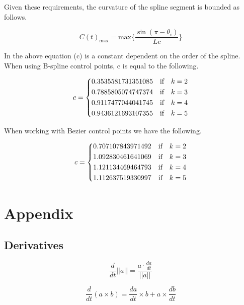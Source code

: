\documentclass{article}
\begin{document}
Given these requirements, the curvature of the spline segment is bounded as follows.

\begin{equation}
    C(t)_{\text{max}} = \text{max}\Big\{\frac{\sin(\pi-\theta_i)}{Lc}\Big\}
\end{equation}

In the above equation (c) is a constant dependent on the order of the spline. When using B-spline control points, c is equal to the following.

\begin{equation}
    c = \begin{dcases} 0.3535581731351085 \quad \text{if} \quad k = 2 \\
    0.7885805074747374 \quad \text{if} \quad k = 3 \\
    0.9117477044041745 \quad \text{if} \quad k = 4 \\
    0.9436121693107355 \quad \text{if} \quad k = 5 \\
    \end{dcases}
\end{equation}

When working with Bezier control points we have the following.

\begin{equation}
    c = \begin{dcases} 0.707107843971492 \quad \text{if} \quad k = 2 \\
    1.092830461641069 \quad \text{if} \quad k = 3 \\
    1.121134469464793 \quad \text{if} \quad k = 4 \\
    1.112637519330997 \quad \text{if} \quad k = 5 \\
    \end{dcases}
\end{equation}

\section{Appendix}

\subsection{Derivatives}

\begin{equation}
    \frac{d}{dt} ||a|| = \frac{a \cdot \frac{da}{dt}}{||a||}
\end{equation}

\begin{equation}
    \frac{d}{dt} (a \times b) = \frac{da}{dt} \times b +  a \times \frac{db}{dt}
\end{equation}
\end{document}
